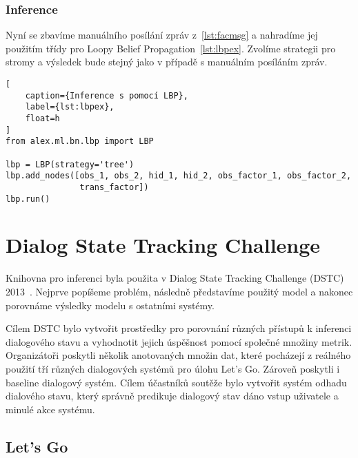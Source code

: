 \subsubsection{Inference}

Nyní se zbavíme manuálního posílání zpráv z~\ref{lst:facmsg} a nahradíme jej použitím třídy pro Loopy Belief Propagation~\ref{lst:lbpex}. 
Zvolíme strategii pro stromy a výsledek bude stejný jako v případě s manuálním posíláním zpráv.

\begin{lstlisting}[
	caption={Inference s pomocí LBP},
	label={lst:lbpex},
	float=h
]
from alex.ml.bn.lbp import LBP

lbp = LBP(strategy='tree')
lbp.add_nodes([obs_1, obs_2, hid_1, hid_2, obs_factor_1, obs_factor_2,
               trans_factor])
lbp.run()
\end{lstlisting}

\section{Dialog State Tracking Challenge}

Knihovna pro inferenci byla použita v Dialog State Tracking Challenge (DSTC) 2013~\cite{dstc2013}.
Nejprve popíšeme problém, následně představíme použitý model a nakonec porovnáme výsledky modelu s ostatními systémy.

Cílem DSTC bylo vytvořit prostředky pro porovnání různých přístupů k inferenci dialogového stavu a vyhodnotit jejich úspěšnost pomocí společné množiny metrik.
Organizátoři poskytli několik anotovaných množin dat, které pocházejí z reálného použití tří různých dialogových systémů pro úlohu Let's Go.
Zároveň poskytli i baseline dialogový systém.
Cílem účastníků soutěže bylo vytvořit systém odhadu dialového stavu, který správně predikuje dialogový stav dáno vstup uživatele a minulé akce systému.

\subsection{Let's Go}

